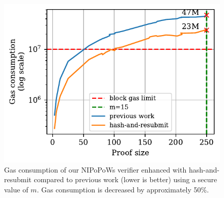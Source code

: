 \begin{figure}
    \begin{center}
        \includegraphics[width=0.9\columnwidth]{figures/har-nipopows.pdf}
    \end{center}
    \caption{Gas consumption of our NIPoPoWs verifier enhanced with hash-and-resubmit
        compared to previous work (lower is better) using a secure value of $m$.
        Gas consumption is decreased by approximately 50\%.}
    \label{fig:har-nipopow}
\end{figure}
